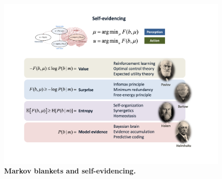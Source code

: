 \documentclass{article}
\begin{document}
\begin{figure}
    \centering
    \includegraphics[width=\textwidth]{FigureVFEinterpretations.png}
    \caption{\textbf{Markov blankets and self-evidencing.}
}
\end{figure}
\end{document}
